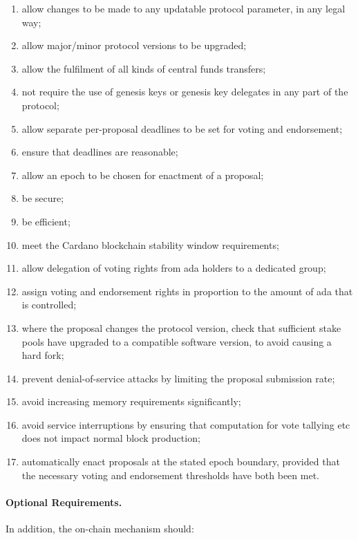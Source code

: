 \begin{enumerate}
\item
  allow changes to be made to any updatable protocol parameter, in any legal way;
\item
  allow major/minor protocol versions to be upgraded;
\item
  allow the fulfilment of all kinds of central funds transfers;
\item
  not require the use of genesis keys or genesis key delegates in any part of the protocol;
\item
  allow separate per-proposal deadlines to be set for voting and endorsement;
\item
  ensure that deadlines are reasonable;
\item
  allow an epoch to be chosen for enactment of a proposal;
\item
  be secure;
\item
  be efficient;
\item
  meet the Cardano blockchain stability window requirements;
\item
  allow delegation of voting rights from ada holders to a dedicated group;
\item
  assign voting and endorsement rights in proportion to the amount of ada that is controlled;
\item
  where the proposal changes the protocol version, check that sufficient stake pools have upgraded to a compatible software version, to avoid causing a hard fork;
\item
  prevent denial-of-service attacks by limiting the proposal submission rate;
\item
  avoid increasing memory requirements significantly;
\item
  avoid service interruptions by ensuring that computation for vote tallying etc does not impact normal block production;
\item
  automatically enact proposals at the stated epoch boundary, provided that the necessary voting and endorsement thresholds have both been met.
\end{enumerate}

\paragraph{Optional Requirements.}  In addition, the on-chain mechanism should:


